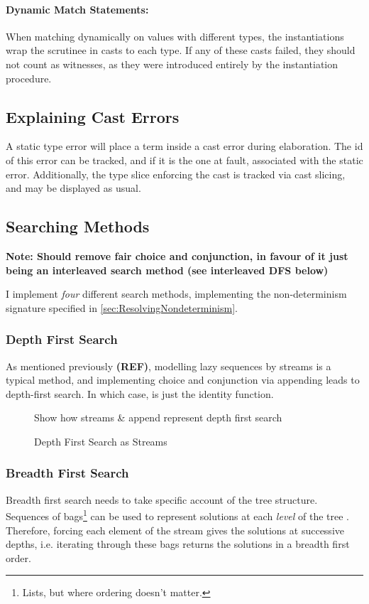 \paragraph{Dynamic Match Statements:} When matching dynamically on values with different types, the instantiations wrap the scrutinee in casts to each type. If any of these casts failed, they should not count as witnesses, as they were introduced entirely by the instantiation procedure. 

\subsection{Explaining Cast Errors}
\label{sec:StaticCastError}
A static type error will place a term inside a cast error during elaboration. The id of this error can be tracked, and if it is the one at fault, associated with the static error. Additionally, the type slice enforcing the cast is tracked via cast slicing, and may be displayed as usual.

\subsection{Searching Methods}\label{sec:SearchMethods}
\textbf{Note: Should remove fair choice and conjunction, in favour of it just being an interleaved search method (see interleaved DFS below)}

I implement \textit{four} different search methods, implementing the non-determinism signature specified in \cref{sec:ResolvingNondeterminism}.

\subsubsection{Depth First Search}
As mentioned previously \textbf{(REF)}, modelling lazy sequences by streams is a typical method, and implementing choice and conjunction via appending leads to depth-first search. In which case,  is just the identity function.

\begin{figure}
Show how streams \& append represent depth first search
\caption{Depth First Search as Streams}
\end{figure}

\subsubsection{Breadth First Search}
Breadth first search needs to take specific account of the tree structure. Sequences of bags\footnote{Lists, but where ordering doesn't matter.} can be used to represent solutions at each \textit{level} of the tree \cite{BFSCombinators}. Therefore, forcing each element of the stream gives the solutions at successive depths, i.e. iterating through these bags returns the solutions in a breadth first order.

